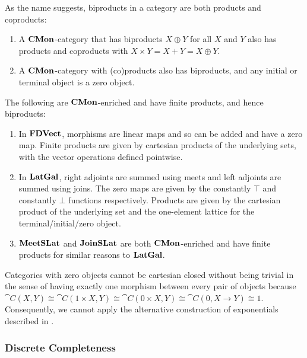 As the name suggests, biproducts in a category are both products and
coproducts:
\begin{proposition}
  \item
  \begin{enumerate}[leftmargin=\enummargin]
  \item A $\mathbf{CMon}$-category that has biproducts $X \oplus Y$ for all
    $X$ and $Y$ also has products and coproducts with
    $X \times Y = X + Y = X \oplus Y$.
  \item A $\mathbf{CMon}$-category with (co)products also has biproducts, and
    any initial or terminal object is a zero object.
  \end{enumerate}
\end{proposition}

\begin{example}
  The following are $\mathbf{CMon}$-enriched and have finite products, and
  hence biproducts:
  \begin{enumerate}[leftmargin=\enummargin]
  \item In $\mathbf{FDVect}$, morphisms are linear maps and so can be added
    and have a zero map. Finite products are given by cartesian
    products of the underlying sets, with the vector operations
    defined pointwise.
  \item In $\mathbf{LatGal}$, right adjoints are summed using meets and left
    adjoints are summed using joins. The zero maps are given by the
    constantly $\top$ and constantly $\bot$ functions
    respectively. Products are given by the cartesian product of the
    underlying set and the one-element lattice for the
    terminal/initial/zero object.
  \item $\mathbf{MeetSLat}$ and $\mathbf{JoinSLat}$ are both $\mathbf{CMon}$-enriched and have
    finite products for similar reasons to $\mathbf{LatGal}$.
  \end{enumerate}
\end{example}

\begin{remark}
  Categories with zero objects cannot be cartesian closed without
  being trivial in the sense of having exactly one morphism between
  every pair of objects because
  $\cat{C}(X, Y) \cong \cat{C}(1 \times X,Y) \cong \cat{C}(0 \times
  X,Y) \cong \cat{C}(0,X \to Y) \cong 1$. Consequently, we cannot
  apply the alternative construction of exponentials described in
  .
\end{remark}

\subsubsection{Discrete Completeness}
\label{sec:fixing-completeness}

